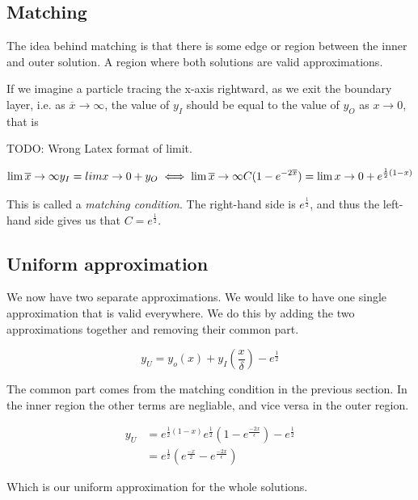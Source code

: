 \documentclass[12pt]{article}
\begin{document}
\subsection{Matching}

The idea behind matching is that there is some edge or region between the inner
and outer solution. A region where both solutions are valid approximations.

If we imagine a particle tracing the x-axis rightward, as we exit the boundary
layer, i.e. as $\overline{x} \to \infty$, the value of $y_I$ should be equal to
the value of $y_O$ as $x \to 0$, that is

TODO: Wrong Latex format of limit.

\begin{equation}
\lim \overline{x} \to \infty y_I = \\lim x \to 0+ y_O \iff 
\lim \overline{x} \to \infty C(1 - e^{-2\overline{x}}) = \lim x \to 0+ e^{\frac{1}{2}(1-x)}
\end{equation}

This is called a \textit{matching condition}. The right-hand side is
$e^{\frac{1}{2}}$, and thus the left-hand side gives us that $C =
e^{\frac{1}{2}}$.

\subsection{Uniform approximation}

We now have two separate approximations. We would like to have one single
approximation that is valid everywhere. We do this by adding the two
approximations together and removing their common part.

\begin{equation}
y_U = y_o(x) + y_I(\frac{x}{\delta}) - e^{\frac{1}{2}}
\end{equation}

The common part comes from the matching condition in the previous section. In
the inner region the other terms are negliable, and vice versa in the outer
region.

\begin{align}
y_U &= e^{\frac{1}{2}(1-x)} e^{\frac{1}{2}}(1 - e^{\frac{-2x}{\epsilon}}) -
e^{\frac{1}{2}} \\
    &=  e^{\frac{1}{2}}(e^{\frac{-x}{2}} - e^{\frac{-2x}{\epsilon}})
\end{align}

Which is our uniform approximation for the whole solutions.
\end{document}
